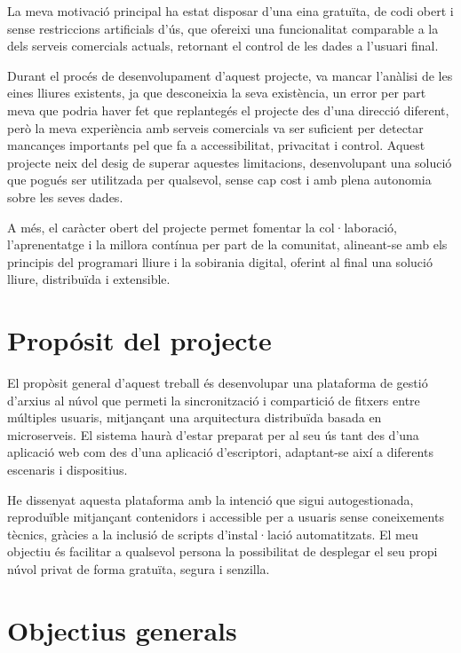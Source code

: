 La meva motivaci\'o principal ha estat disposar d'una eina gratu\"ita, de codi obert i sense restriccions artificials d'\'us, que ofereixi una funcionalitat comparable a la dels serveis comercials actuals, retornant el control de les dades a l'usuari final.

Durant el proc\'es de desenvolupament d'aquest projecte, va mancar l'an\`alisi de les eines lliures existents, ja que desconeixia la seva exist\`encia, un error per part meva que podria haver fet que replanteg\'es el projecte des d'una direcci\'o diferent, per\`o la meva experi\`encia amb serveis comercials va ser suficient per detectar mancan\c{c}es importants pel que fa a accessibilitat, privacitat i control. Aquest projecte neix del desig de superar aquestes limitacions, desenvolupant una soluci\'o que pogu\'es ser utilitzada per qualsevol, sense cap cost i amb plena autonomia sobre les seves dades.

A m\'es, el car\`acter obert del projecte permet fomentar la col·laboraci\'o, l'aprenentatge i la millora cont\'inua per part de la comunitat, alineant-se amb els principis del programari lliure i la sobirania digital, oferint al final una soluci\'o lliure, distribu\"ida i extensible.

\section{Prop\'osit del projecte}

El prop\`osit general d'aquest treball \'es desenvolupar una plataforma de gesti\'o d'arxius al n\'uvol que permeti la sincronitzaci\'o i compartici\'o de fitxers entre m\'ultiples usuaris, mitjan\c{c}ant una arquitectura distribu\"ida basada en microserveis. El sistema haur\`a d'estar preparat per al seu \'us tant des d'una aplicaci\'o web com des d'una aplicaci\'o d'escriptori, adaptant-se aix\'i a diferents escenaris i dispositius.

He dissenyat aquesta plataforma amb la intenci\'o que sigui autogestionada, reprodu\"ible mitjan\c{c}ant contenidors i accessible per a usuaris sense coneixements t\`ecnics, gr\`acies a la inclusi\'o de scripts d'instal·laci\'o automatitzats. El meu objectiu \'es facilitar a qualsevol persona la possibilitat de desplegar el seu propi n\'uvol privat de forma gratu\"ita, segura i senzilla.

\section{Objectius generals}

